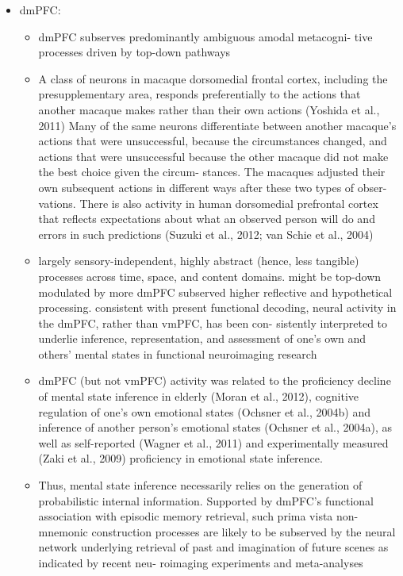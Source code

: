 \documentclass{article} %
\begin{document}
\begin{itemize}
\item
  dmPFC:
  \begin{itemize}
    \item
dmPFC subserves predominantly ambiguous amodal metacogni- tive processes driven by top-down pathways

\item
A class of neurons in macaque dorsomedial frontal cortex, including the presupplementary area, responds preferentially to the actions that another macaque makes rather than their own actions (Yoshida et al., 2011)
Many of the same neurons differentiate between another macaque’s actions that were unsuccessful, because the circumstances changed, and actions that were unsuccessful because the other macaque did not make the best choice given the circum- stances. The macaques adjusted their own subsequent actions in different ways after these two types of obser- vations. There is also activity in human dorsomedial prefrontal cortex that reflects expectations about what an observed person will do and errors in such predictions (Suzuki et al., 2012; van Schie et al., 2004)


\item
largely sensory-independent, highly abstract (hence, less tangible) processes across time, space, and content domains.
might be top-down modulated by more dmPFC subserved higher reflective and hypothetical processing.
consistent with present functional decoding, neural activity in the dmPFC, rather than vmPFC, has been con- sistently interpreted to underlie inference, representation, and assessment of one’s own and others’ mental states in functional neuroimaging research

\item
 dmPFC (but not vmPFC) activity was related to the proficiency decline of mental state inference in elderly (Moran et al., 2012), cognitive regulation of one’s own emotional states (Ochsner et al., 2004b) and inference of another person’s emotional states (Ochsner et al., 2004a), as well as self-reported (Wagner et al., 2011) and experimentally measured (Zaki et al., 2009) proficiency in emotional state inference.

 \item
Thus, mental state inference necessarily relies on the generation of probabilistic internal information. Supported by dmPFC’s functional association with episodic memory retrieval, such prima vista non-mnemonic construction processes are likely to be subserved by the neural network underlying retrieval of past and imagination of future scenes as indicated by recent neu- roimaging experiments and meta-analyses


\end{itemize}
\end{itemize}
\end{document}
